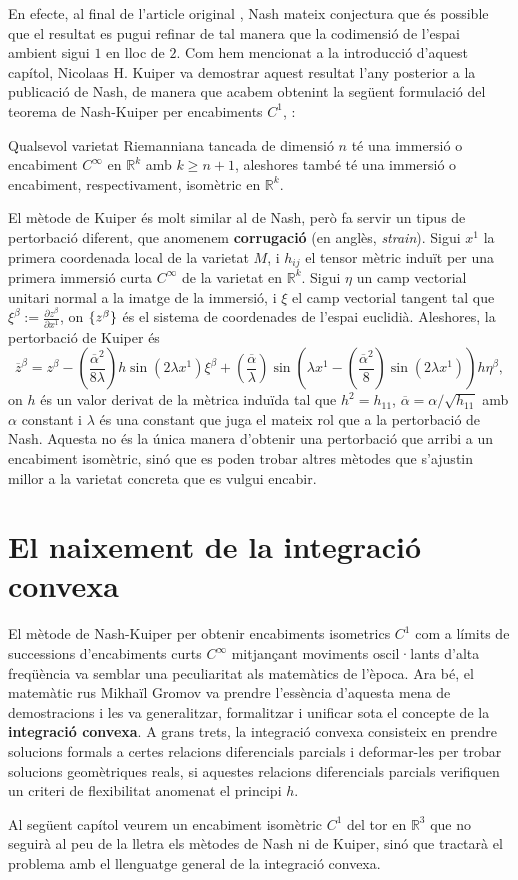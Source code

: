 En efecte, al final de l'article original \cite{nash1954}, Nash mateix conjectura que és possible que el resultat es pugui refinar de tal manera que la codimensió de l'espai ambient sigui $1$ en lloc de $2$. Com hem mencionat a la introducció d'aquest capítol, Nicolaas H. Kuiper va demostrar aquest resultat l'any posterior a la publicació de Nash, de manera que acabem obtenint la següent formulació del teorema de Nash-Kuiper per encabiments $C^1$, \cite{kuiper1955}:

\begin{teo}
    Qualsevol varietat Riemanniana tancada de dimensió $n$ té una immersió o encabiment $C^\infty$ en $\mathbb R^k$ amb $k\ge n+1$, aleshores també té una immersió o encabiment, respectivament, isomètric en $\mathbb R^k$.
\end{teo}

El mètode de Kuiper és molt similar al de Nash, però fa servir un tipus de pertorbació diferent, que anomenem \textbf{corrugació} (en anglès, \textit{strain}). Sigui $x^1$ la primera coordenada local de la varietat $M$, i $h_{ij}$ el tensor mètric induït per una primera immersió curta $C^\infty$ de la varietat en $\mathbb R^k$. Sigui $\eta$ un camp vectorial unitari normal a la imatge de la immersió, i $\xi$ el camp vectorial tangent tal que $\xi^\beta := \frac{\partial z^\beta}{\partial x^1}$, on $\{z^\beta\}$ és el sistema de coordenades de l'espai euclidià. Aleshores, la pertorbació de Kuiper és
\begin{equation*}
    \boxed{
        \overline{z}^\beta = z^\beta - \left(\frac{\overline \alpha^2}{8\lambda}\right)h\sin\left(2\lambda x^1\right)\xi^\beta + \left(\frac{\overline\alpha}{\lambda}\right)\sin\left(\lambda x^1 - \left(\frac{\overline\alpha ^2}{8}\right)\sin\left(2\lambda x^1\right)\right)h\eta^\beta,
        }
\end{equation*}
on $h$ és un valor derivat de la mètrica induïda tal que $h^2 = h_{11}$, $\overline\alpha = \alpha / \sqrt{h_{11}}$ amb $\alpha$ constant i  $\lambda$ és una constant que juga el mateix rol que a la pertorbació de Nash. Aquesta no és la única manera d'obtenir una pertorbació que arribi a un encabiment isomètric, sinó que es poden trobar altres mètodes que s'ajustin millor a la varietat concreta que es vulgui encabir.
\section{El naixement de la integració convexa}
El mètode de Nash-Kuiper per obtenir encabiments isometrics $C^1$ com a límits de successions d'encabiments curts $C^\infty$ mitjançant moviments oscil·lants d'alta freqüència va semblar una peculiaritat als matemàtics de l'època. Ara bé, el matemàtic rus Mikhaïl Gromov va prendre l'essència d'aquesta mena de demostracions i les va generalitzar, formalitzar i unificar sota el concepte de la \textbf{integració convexa}. A grans trets, la integració convexa consisteix en prendre solucions formals a certes relacions diferencials parcials i deformar-les per trobar solucions geomètriques reals, si aquestes relacions diferencials parcials verifiquen un criteri de flexibilitat anomenat el principi $h$.

Al següent capítol veurem un encabiment isomètric $C^1$ del tor en $\mathbb R^3$ que no seguirà al peu de la lletra els mètodes de Nash ni de Kuiper, sinó que tractarà el problema amb el llenguatge general de la integració convexa. 